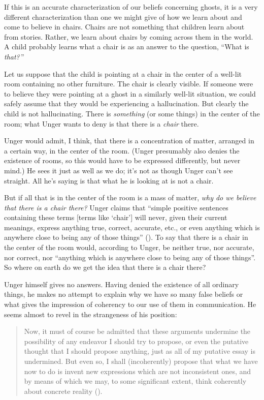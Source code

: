 \documentclass[11pt]{article}
\newenvironment{squote}{%
	\begin{quote}\begin{singlespace}%
	}{%
	\end{singlespace}\end{quote}}
\begin{document}
\begin{spacing}{1.5}
If this is an accurate characterization of our beliefs concerning
ghosts, it is a very different characterization than one we might give
of how we learn about and come to believe in chairs.  Chairs are not
something that children learn about from stories.  Rather, we learn
about chairs by coming across them in the world.  A child probably
learns what a chair is as an answer to the question, ``What is {\em
  that?}\,''

Let us suppose that the child is pointing at a chair in the center of
a well-lit room containing no other furniture.  The chair is clearly
visible.  If someone were to believe they were pointing at a ghost in
a similarly well-lit situation, we could safely assume that they would
be experiencing a hallucination.  But clearly the child is not
hallucinating.  There is {\em something} (or some things) in the
center of the room; what Unger wants to deny is that there is a {\em
  chair} there.

Unger would admit, I think, that there is a concentration of matter,
arranged in a certain way, in the center of the room.  (Unger
presumably also denies the existence of rooms, so this would have to
be expressed differently, but never mind.)  He sees it just as well
as we do; it's not as though Unger can't see straight.  All he's
saying is that what he is looking at is not a chair.

But if all that is in the center of the room is a mass of matter, {\em
  why do we believe that there is a chair there?}  Unger claims that
``simple positive sentences containing these terms [terms like
  `chair'] will never, given their current meanings, express anything
true, correct, accurate, etc., or even anything which is anywhere
close to being any of those things'' (\citeyear[148]{unger1979}).  To
say that there is a chair in the center of the room would, according
to Unger, be neither true, nor accurate, nor correct, nor ``anything
which is anywhere close to being any of those things''.  So where on
earth do we get the idea that there is a chair there?

Unger himself gives no answers.  Having denied the existence of all
ordinary things, he makes no attempt to explain why we have so many
false beliefs or what gives the impression of coherency to our use of
them in communication.  He seems almost to revel in the strangeness of
his position:

\begin{squote}
Now, it must of course be admitted that these arguments
undermine the possibility of any endeavor I should try to propose, or
even the putative thought that I should propose anything, just as all
of my putative essay is undermined.  But even so, I shall
(incoherently) propose that what we have now to do is invent new
expressions which are not inconsistent ones, and by means of which we
may, to some significant extent, think coherently about concrete
reality (\citeyear[544]{unger1980b}).
\end{squote}


\end{spacing}
\end{document}
